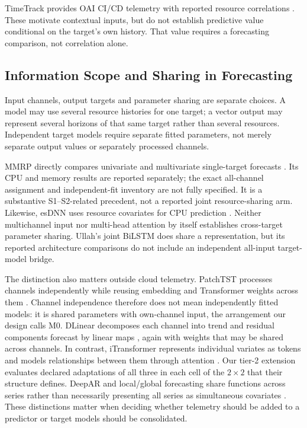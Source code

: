 \documentclass[a4paper,fleqn]{cas-dc}
\begin{document}
TimeTrack provides OAI CI/CD telemetry with reported resource correlations
\citep{Meliani2025TimeTrack}. These motivate contextual inputs, but do not
establish predictive value conditional on the target's own history.
That value requires a forecasting comparison, not correlation alone.

\subsection{Information Scope and Sharing in Forecasting}
\label{sec:rw-information-sharing}

Input channels, output targets and parameter sharing are separate choices.
A model may use several resource histories for one target; a vector output
may represent several horizons of that same target rather than several
resources. Independent target models require separate fitted parameters,
not merely separate output values or separately processed channels.

MMRP directly compares univariate and multivariate single-target forecasts
\citep{Tripathi2025MMRP}. Its CPU and memory results are reported separately;
the exact all-channel assignment and independent-fit inventory are not fully
specified. It is a substantive S1--S2-related precedent, not a reported joint
resource-sharing arm. Likewise, esDNN uses resource covariates for CPU
prediction \citep{Xu2022esDNN}. Neither multichannel input nor multi-head
attention by itself establishes cross-target parameter sharing. Ullah's joint
BiLSTM does share a representation, but its reported architecture comparisons
do not include an independent all-input target-model bridge.

The distinction also matters outside cloud telemetry. PatchTST processes
channels independently while reusing embedding and Transformer weights across
them \citep{Nie2023PatchTST}. Channel independence therefore does not mean
independently fitted models: it is shared parameters with own-channel input,
the arrangement our design calls M0. DLinear decomposes each channel into
trend and residual components forecast by linear maps \citep{Zeng2023DLinear},
again with weights that may be shared across channels. In contrast,
iTransformer represents individual variates as tokens and models
relationships between them through attention \citep{Liu2024iTransformer}.
Our tier-2 extension evaluates declared adaptations of all three in each
cell of the $2\times2$ that their structure defines.
DeepAR and local/global forecasting share functions across series rather than
necessarily presenting all series as simultaneous covariates
\citep{Salinas2020DeepAR,MonteroManso2021GlobalForecasting}.
These distinctions matter when deciding whether telemetry should be added to
a predictor or target models should be consolidated.
\end{document}
